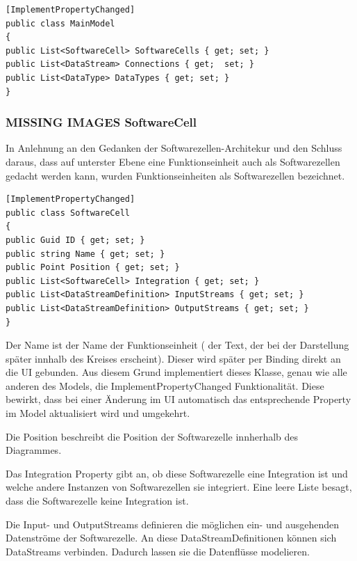 \begin{verbatim}
[ImplementPropertyChanged]
public class MainModel
{
public List<SoftwareCell> SoftwareCells { get; set; }
public List<DataStream> Connections { get;  set; }
public List<DataType> DataTypes { get; set; } 
}
\end{verbatim}

\subsubsection{{\bfseries\sffamily MISSING IMAGES} SoftwareCell}
\label{sec:orgheadline8}
In Anlehnung an den Gedanken der Softwarezellen-Architekur und den Schluss
daraus, dass auf unterster Ebene eine Funktionseinheit auch als
Softwarezellen gedacht werden kann, wurden Funktionseinheiten als
Softwarezellen bezeichnet.

\begin{verbatim}
[ImplementPropertyChanged]
public class SoftwareCell
{
public Guid ID { get; set; }
public string Name { get; set; }
public Point Position { get; set; }
public List<SoftwareCell> Integration { get; set; }
public List<DataStreamDefinition> InputStreams { get; set; }
public List<DataStreamDefinition> OutputStreams { get; set; }
}
\end{verbatim}

Der Name ist der Name der Funktionseinheit ( der Text, der bei der
Darstellung später innhalb des Kreises erscheint). Dieser wird später per Binding
direkt an die UI gebunden. Aus diesem Grund implementiert dieses Klasse,
genau wie alle anderen des Models, die ImplementPropertyChanged
Funktionalität. Diese bewirkt, dass bei einer Änderung im UI automatisch das
entsprechende Property im Model aktualisiert wird und umgekehrt.

Die Position beschreibt die Position der Softwarezelle innherhalb des
Diagrammes.  

Das Integration Property gibt an, ob diese Softwarezelle eine Integration
ist und welche andere Instanzen von Softwarezellen sie integriert.
Eine leere Liste besagt, dass die Softwarezelle keine Integration ist.

Die Input- und OutputStreams definieren die möglichen ein- und ausgehenden
Datenströme der Softwarezelle. An diese DataStreamDefinitionen können sich DataStreams
verbinden. Dadurch lassen sie die Datenflüsse modelieren.

